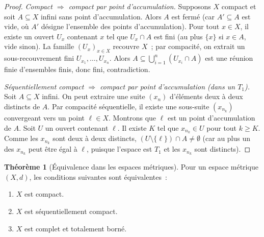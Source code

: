 \documentclass[12pt,a4paper,openany]{book}
\theoremstyle{definition}
\theoremstyle{cours}
\newtheorem{theoreme}{Théorème}[chapter]
\theoremstyle{coursnormal}
\begin{document}
\begin{proof}
  \emph{Compact $\Rightarrow$ compact par point d'accumulation.}
  Supposons $X$ compact et soit $A\subseteq X$ infini sans point d'accumulation.
  Alors $A$ est fermé (car $A'\subseteq A$ est vide, où $A'$ désigne l'ensemble
  des points d'accumulation). Pour tout $x\in X$, il existe un ouvert $U_x$
  contenant $x$ tel que $U_x\cap A$ est fini (au plus $\{x\}$ si $x\in A$,
  vide sinon). La famille $(U_x)_{x\in X}$ recouvre $X$~; par compacité, on
  extrait un sous-recouvrement fini $U_{x_1},\ldots,U_{x_n}$. Alors
  $A\subseteq\bigcup_{i=1}^n(U_{x_i}\cap A)$ est une réunion finie
  d'ensembles finis, donc fini, contradiction.

  \medskip
  \emph{Séquentiellement compact $\Rightarrow$ compact par point d'accumulation
  (dans un $T_1$).}
  Soit $A\subseteq X$ infini. On peut extraire une suite $(x_n)$ d'éléments
  deux à deux distincts de $A$. Par compacité séquentielle, il existe une
  sous-suite $(x_{n_k})$ convergeant vers un point $\ell\in X$. Montrons que
  $\ell$ est un point d'accumulation de $A$. Soit $U$ un ouvert contenant
  $\ell$. Il existe $K$ tel que $x_{n_k}\in U$ pour tout $k\geq K$. Comme les
  $x_{n_k}$ sont deux à deux distincts, $(U\setminus\{\ell\})\cap A\neq\emptyset$
  (car au plus un des $x_{n_k}$ peut être égal à $\ell$, puisque l'espace est
  $T_1$ et les $x_{n_k}$ sont distincts).
\end{proof}

\begin{theoreme}[Équivalence dans les espaces métriques]\label{thm:compact-metrique}
  Pour un espace métrique $(X,d)$, les
  conditions suivantes sont équivalentes~:
  \begin{enumerate}
    \item\label{it:cpt1} $X$ est compact.
    \item\label{it:cpt2} $X$ est séquentiellement compact.
    \item\label{it:cpt3} $X$ est complet et totalement borné.
  \end{enumerate}
\end{theoreme}
\end{document}

